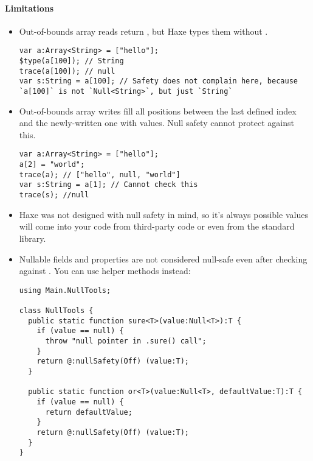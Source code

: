\paragraph{Limitations}

\begin{itemize}
    \item Out-of-bounds array reads return , but Haxe types them without .
    \begin{lstlisting}
var a:Array<String> = ["hello"];
$type(a[100]); // String
trace(a[100]); // null
var s:String = a[100]; // Safety does not complain here, because `a[100]` is not `Null<String>`, but just `String`
\end{lstlisting}
    \item Out-of-bounds array writes fill all positions between the last defined index and the newly-written one with  values. Null safety cannot protect against this.
    \begin{lstlisting}
var a:Array<String> = ["hello"];
a[2] = "world";
trace(a); // ["hello", null, "world"]
var s:String = a[1]; // Cannot check this
trace(s); //null
\end{lstlisting}
    \item Haxe was not designed with null safety in mind, so it's always possible  values will come into your code from third-party code or even from the standard library.
    \item Nullable fields and properties are not considered null-safe even after checking against . You can use helper methods instead:
    \begin{lstlisting}
using Main.NullTools;

class NullTools {
  public static function sure<T>(value:Null<T>):T {
    if (value == null) {
      throw "null pointer in .sure() call";
    }
    return @:nullSafety(Off) (value:T);
  }

  public static function or<T>(value:Null<T>, defaultValue:T):T {
    if (value == null) {
      return defaultValue;
    }
    return @:nullSafety(Off) (value:T);
  }
}


\end{lstlisting}
\end{itemize}
